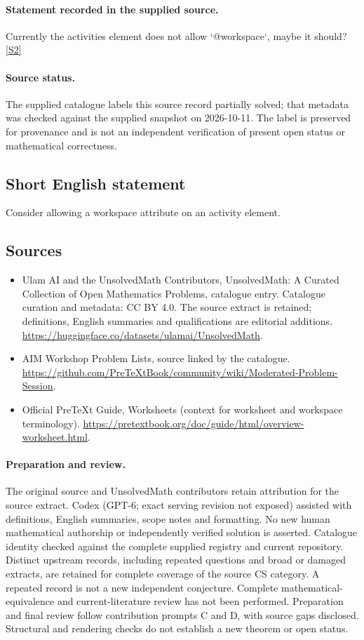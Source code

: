 \documentclass[11pt]{article}
\begin{document}
\paragraph{Statement recorded in the supplied source.}
Currently the activities element does not allow `@workspace`, maybe it should? \href{https://github.com/PreTeXtBook/community/wiki/Moderated-Problem-Session}{[S2]}
\paragraph{Source status.}
The supplied catalogue labels this source record partially solved; that metadata was checked against the supplied snapshot on 2026-10-11. The label is preserved for provenance and is not an independent verification of present open status or mathematical correctness.
\subsection{Short English statement}
Consider allowing a workspace attribute on an activity element.
\subsection{Sources}
\begin{itemize}
\item[S1] Ulam AI and the UnsolvedMath Contributors, UnsolvedMath: A Curated Collection of Open Mathematics Problems, catalogue entry. Catalogue curation and metadata: CC BY 4.0. The source extract is retained; definitions, English summaries and qualifications are editorial additions.
\url{https://huggingface.co/datasets/ulamai/UnsolvedMath}.
\item[S2] AIM Workshop Problem Lists, source linked by the catalogue.
\url{https://github.com/PreTeXtBook/community/wiki/Moderated-Problem-Session}.
\item[S3] Official PreTeXt Guide, Worksheets (context for worksheet and workspace terminology).
\url{https://pretextbook.org/doc/guide/html/overview-worksheet.html}.
\end{itemize}
\paragraph{Preparation and review.}
The original source and UnsolvedMath contributors retain attribution for the source extract. Codex (GPT-6; exact serving revision not exposed) assisted with definitions, English summaries, scope notes and formatting. No new human mathematical authorship or independently verified solution is asserted. Catalogue identity checked against the complete supplied registry and current repository. Distinct upstream records, including repeated questions and broad or damaged extracts, are retained for complete coverage of the source CS category. A repeated record is not a new independent conjecture. Complete mathematical-equivalence and current-literature review has not been performed. Preparation and final review follow contribution prompts C and D, with source gaps disclosed. Structural and rendering checks do not establish a new theorem or open status.
\label{end:statement}
\end{document}
